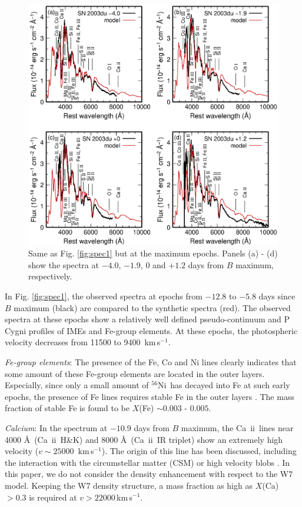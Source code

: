 \documentclass[usegraphicx,usenatbib]{mn2e}
\newcommand{\kms}{\mbox{\,km\,s$^{-1}$}}
\newcommand{\eg}{e.g.,\ }
\newcommand{\CaII}{Ca~{\sc ii}}
\newcommand{\Nifs}{$^{56}$Ni}
\begin{document}
\begin{figure}
  \includegraphics[scale=0.7]{f3.eps}
  \caption{
Same as Fig. \ref{fig:spec1} but at the maximum epochs.
Panels (a) - (d) show the spectra at $-4.0$, $-1.9$, $0$ and $+1.2$ days
from $B$ maximum, respectively. 
}
\label{fig:spec2}
\end{figure}

In Fig. \ref{fig:spec1}, the observed spectra at epochs from $-12.8$ to $-5.8$
days since $B$ maximum (black) are compared to the synthetic spectra (red).
The observed spectra at these epochs show a relatively well defined
pseudo-continuum and P Cygni profiles of IMEs and Fe-group elements. At these
epochs, the photospheric velocity decreases from 11500 to 9400 \kms.

{\it Fe-group elements}:  The presence of the Fe, Co and Ni lines clearly
indicates that some amount of these Fe-group elements are located in the outer
layers. Especially, since only a small amount of \Nifs\ has decayed into Fe at
such early epochs, the presence of Fe lines requires stable Fe in the
outer layers \citep{tanaka08Ia}. The mass fraction of stable Fe is found to be
$X$(Fe) $\sim 0.003$ - $0.005$.

{\it Calcium}:  In the spectrum at $-10.9$ days from $B$ maximum, the \CaII\
lines near 4000 \AA\ (\CaII\ H\&K) and 8000 \AA\ (\CaII\ IR triplet) show an
extremely high velocity ($v \sim 25000$ \kms). The origin of this line has been
discussed, including the interaction with the circumstellar matter (CSM) or high
velocity blobs \citep[\eg][]{hatano99, thomas04, gerardy04, mazzali0599ee,
mazzali05Ia, quimby06, tanaka06, altavilla07,garavini07}. 
In this paper, we do not consider the density enhancement with 
respect to the W7 model.
Keeping the W7 density structure, a mass fraction as high as $X$(Ca) $> 0.3$ 
is required at $v > 22000$\kms.
\end{document}
